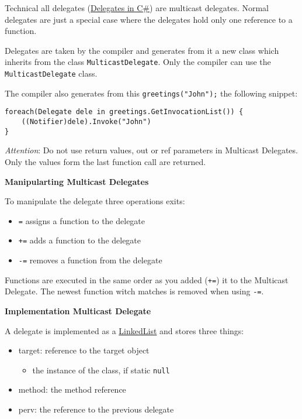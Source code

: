 \documentclass[11pt,twoside,landscape]{article}
\begin{document}
\begin{multicols}{3}
Technical all delegates (\href{../../../roam/20211029145415-delegates_in_c.org}{Delegates in C\#}) are multicast delegates. Normal delegates are just a special case where the delegates hold only one reference to a function.

Delegates are taken by the compiler and generates from it a new class which inherits from the class \texttt{MulticastDelegate}. Only the compiler can use the \texttt{MulticastDelegate} class.

The compiler also generates from this \texttt{greetings("John");} the following snippet:
\lstset{language=csharp,label= ,caption= ,captionpos=b,numbers=none}
\begin{lstlisting}
foreach(Delegate dele in greetings.GetInvocationList()) {
    ((Notifier)dele).Invoke("John")
}
\end{lstlisting}

\emph{Attention}: Do not use return values, out or ref parameters in Multicast Delegates.
Only the values form the last function call are returned. 


\textbf{Manipularting Multicast Delegates}

To manipulate the delegate three operations exits:
\begin{itemize}
\item \texttt{=} assigns a function to the delegate
\item \texttt{+=} adds a function to the delegate
\item \texttt{-=} removes a function from the delegate
\end{itemize}


Functions are executed in the same order as you added (\texttt{+=}) it to the Multicast Delegate.
The newest function witch matches is removed when using \texttt{-=}.

\textbf{Implementation Multicast Delegate}

A delegate is implemented as a \href{../../../roam/20210806213600-linkedlist.org}{LinkedList} and stores three things:
\begin{itemize}
\item target: reference to the target object
\begin{itemize}
\item the instance of the class, if static \texttt{null}
\end{itemize}
\item method: the method reference
\item perv: the reference to the previous delegate
\end{itemize}



\end{multicols}
\end{document}
